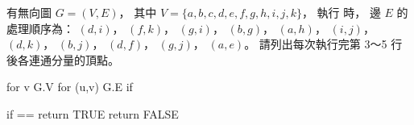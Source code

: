 \startEXERCISE
有無向圖 $G=(V,E)$，
其中 $V=\{a,b,c,d,e,f,g,h,i,j,k\}$，
執行  時，
邊 $E$ 的處理順序為：
 $(d,i)$， $(f,k)$， $(g,i)$， $(b,g)$， $(a,h)$， $(i,j)$， $(d,k)$， $(b,j)$， $(d,f)$， $(g,j)$， $(a,e)$。
請列出每次執行完第 3～5 行後各連通分量的頂點。

\startCLRSCODE
for v \in G.V
for (u,v) \in G.E
	if  \ne {}
\stopCLRSCODE

\startCLRSCODE
if  == 
	return TRUE
return FALSE
\stopCLRSCODE

\stopEXERCISE

\startANSWER
{
\txx
{}
}
\stopANSWER
